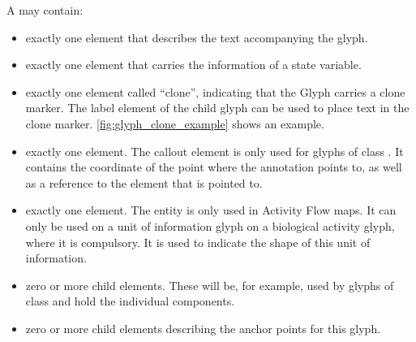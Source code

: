 A \Glyph may contain: 

\begin{itemize}
  \item exactly one \Label element that describes the text accompanying the glyph.
  \item exactly one \State element that carries the information of a state variable.
  \item exactly one \Glyph element called ``clone'', indicating that the Glyph carries a clone marker. The label element of the child glyph can be used to place text in the clone marker. \ref{fig:glyph_clone_example} shows an example. 
  \item exactly one \Callout element. The callout element is only used for glyphs of class . It contains the coordinate of the point where the annotation points to, as well as a reference to the element that is pointed to.
  \item exactly one \Entity element. The entity is only used in Activity Flow maps. It can only be used on a unit of information glyph on a biological activity glyph, where it is compulsory. It is used to indicate the shape of this unit of information.
  \item zero or more child \Glyph elements. These will be, for example, used by glyphs of class  and hold the individual components.
  \item zero or more child \Port elements describing the anchor points for this glyph.
\end{itemize}





